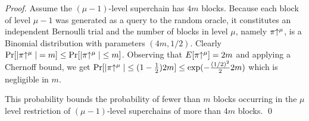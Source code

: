 \begin{proof}
    Assume the $(\mu - 1)$-level superchain has $4m$ blocks. Because each block
    of level $\mu - 1$ was generated as a query to the random oracle, it
    constitutes an independent Bernoulli trial and the number of blocks in level
    $\mu$, namely $\pi\negthickspace\uparrow^\mu$, is a Binomial distribution with parameters
    $(4m, 1/2)$. Clearly
    $\Pr[|\pi\negthickspace\uparrow^\mu| = m] \leq \Pr[|\pi\negthickspace\uparrow^\mu| \leq m]$. Observing
    that $E[\pi\negthickspace\uparrow^\mu] = 2m$ and applying a Chernoff bound, we get
    $\Pr[|\pi\negthickspace\uparrow^\mu| \leq (1 - \frac{1}{2})2m] \leq \exp(-\frac{(1/2)^2}{2}
    2m)$ which is negligible in $m$.


    This probability bounds the probability of fewer than $m$ blocks occurring
    in the $\mu$ level restriction of $(\mu - 1)$-level superchains of more than
    $4m$ blocks.
    \qed
\end{proof}
